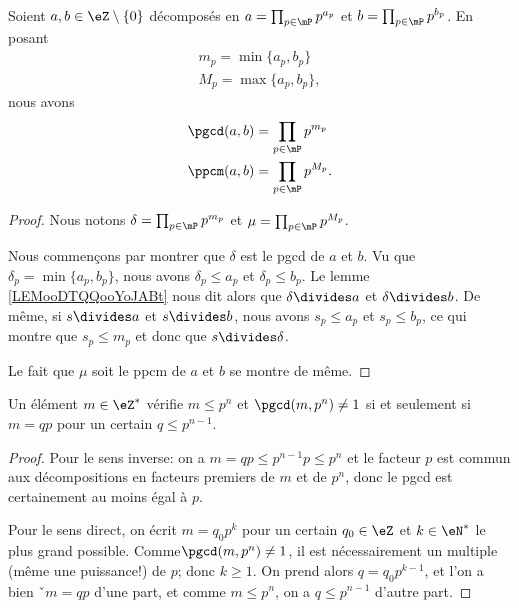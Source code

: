 \begin{proposition}     \label{PROPooNQBOooHWqTvs}
    Soient \( a,b\in \eZ\setminus\{ 0 \}\) décomposés en \( a=\prod_{p\in\mP}p^{a_p}\) et \( b=\prod_{p\in\mP}p^{b_p}\). En posant 
    \begin{subequations}
        \begin{align}
            m_p=\min\{ a_p,b_p \}\\
            M_p=\max\{ a_p,b_p \},
        \end{align}
    \end{subequations}
    nous avons
    \begin{subequations}
        \begin{align}
            \pgcd(a,b)&=\prod_{p\in\mP}p^{m_p}\\
            \ppcm(a,b)&=\prod_{p\in\mP}p^{M_p}.
        \end{align}
    \end{subequations}
\end{proposition}

\begin{proof}
    Nous notons $\delta=\prod_{p\in\mP}p^{m_p}$ et $\mu=\prod_{p\in\mP}p^{M_p}$. 
    
    Nous commençons par montrer que \( \delta\) est le pgcd de \( a\) et \( b\). Vu que \( \delta_p=\min\{ a_p,b_p \}\), nous avons \( \delta_p\leq a_p\) et \( \delta_p\leq b_p\). Le lemme \ref{LEMooDTQQooYoJABt} nous dit alors que \( \delta\divides a\) et \( \delta\divides b\). De même, si \(s\divides a\) et \( s\divides b\), nous avons \( s_p\leq a_p\) et \( s_p\leq b_p\), ce qui montre que \( s_p\leq m_p\) et donc que \( s\divides \delta\).

    Le fait que \( \mu\) soit le ppcm de \( a\) et \( b\) se montre de même.
\end{proof}

\begin{corollary}  \label{CORooQIMHooUzLUJY}
    Un élément \( m\in \eZ^*\) vérifie \( m\leq p^n\) et \( \pgcd(m,p^n)\neq 1\) si et seulement si \( m=qp\) pour un certain \( q\leq p^{n-1}\).
\end{corollary}

\begin{proof}
Pour le sens inverse: on a \( m = qp \leq p^{n-1}p \leq p^n \) et le facteur \( p \) est commun aux décompositions en facteurs premiers de \( m \) et de \( p^n \), donc le pgcd est certainement au moins égal à \( p \).

Pour le sens direct, on écrit \( m = q_0 p^k \) pour un certain \( q_0 \in \eZ \) et \( k \in \eN^* \) le plus grand possible. Comme\( \pgcd(m,p^n)\neq 1\), il est nécessairement un multiple (même une puissance!) de \( p \); donc \( k \geq 1 \). On prend alors \( q = q_0 p^{k-1} \), et l'on a bien ˇ\( m = qp \) d'une part, et comme \( m\leq p^n\), on a \( q\leq p^{n-1}\) d'autre part.
\end{proof}

